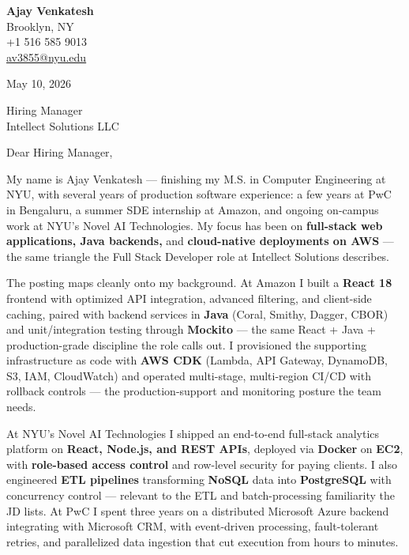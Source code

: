 \documentclass[letterpaper,11pt]{article}
\begin{document}
\begin{flushleft}
\textbf{\large Ajay Venkatesh} \\
Brooklyn, NY \\
+1 516 585 9013 \\
\href{mailto:av3855@nyu.edu}{av3855@nyu.edu}
\end{flushleft}

\vspace{10pt}

May 10, 2026

\vspace{6pt}

Hiring Manager \\
Intellect Solutions LLC

\vspace{10pt}

Dear Hiring Manager,

My name is Ajay Venkatesh --- finishing my M.S. in Computer Engineering at NYU, with several years of production software experience: a few years at PwC in Bengaluru, a summer SDE internship at Amazon, and ongoing on-campus work at NYU's Novel AI Technologies. My focus has been on \textbf{full-stack web applications, Java backends,} and \textbf{cloud-native deployments on AWS} --- the same triangle the Full Stack Developer role at Intellect Solutions describes.

The posting maps cleanly onto my background. At Amazon I built a \textbf{React 18} frontend with optimized API integration, advanced filtering, and client-side caching, paired with backend services in \textbf{Java} (Coral, Smithy, Dagger, CBOR) and unit/integration testing through \textbf{Mockito} --- the same React + Java + production-grade discipline the role calls out. I provisioned the supporting infrastructure as code with \textbf{AWS CDK} (Lambda, API Gateway, DynamoDB, S3, IAM, CloudWatch) and operated multi-stage, multi-region CI/CD with rollback controls --- the production-support and monitoring posture the team needs.

At NYU's Novel AI Technologies I shipped an end-to-end full-stack analytics platform on \textbf{React, Node.js, and REST APIs}, deployed via \textbf{Docker} on \textbf{EC2}, with \textbf{role-based access control} and row-level security for paying clients. I also engineered \textbf{ETL pipelines} transforming \textbf{NoSQL} data into \textbf{PostgreSQL} with concurrency control --- relevant to the ETL and batch-processing familiarity the JD lists. At PwC I spent three years on a distributed Microsoft Azure backend integrating with Microsoft CRM, with event-driven processing, fault-tolerant retries, and parallelized data ingestion that cut execution from hours to minutes.
\end{document}
